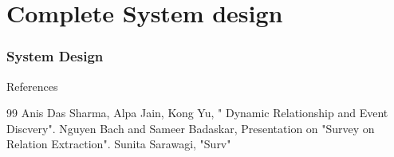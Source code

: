 \documentclass[10pt]{beamer}
\begin{document}
\section{Complete System design}

\begin{frame}
\frametitle{System Design}


\end{frame}





\begin{frame}{References}
  \begin{thebibliography}{99}
Anis Das Sharma, Alpa Jain, Kong Yu, " Dynamic Relationship and Event Discvery".
Nguyen Bach and Sameer Badaskar, Presentation on "Survey on Relation Extraction".
Sunita Sarawagi, "Surv"

\end{thebibliography}
\end{frame}

\begin{frame}
\Large
\begin{center}
\end{center}
\end{frame}
\end{document}
